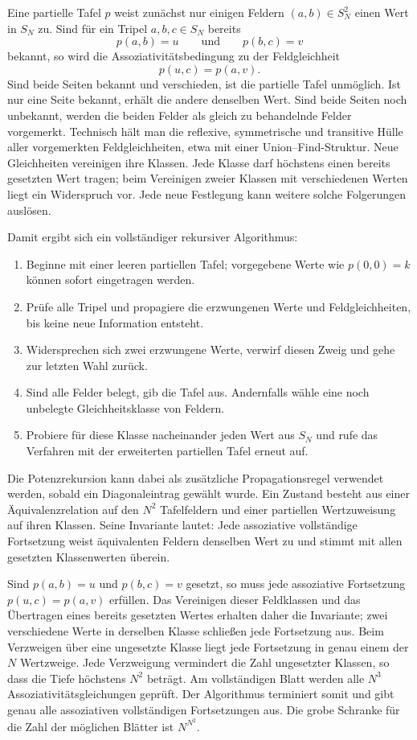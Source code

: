 \documentclass[main.tex]{subfiles}
\begin{document}
Eine partielle Tafel \(p\) weist zunächst nur einigen Feldern
\((a,b)\in S_N^2\) einen Wert in \(S_N\) zu.  Sind für ein Tripel
\(a,b,c\in S_N\) bereits
\[
  p(a,b)=u
  \qquad\text{und}\qquad
  p(b,c)=v
\]
bekannt, so wird die Assoziativitätsbedingung zu der Feldgleichheit
\[
  \boxed{p(u,c)=p(a,v).}
\]
Sind beide Seiten bekannt und verschieden, ist die partielle Tafel
unmöglich.  Ist nur eine Seite bekannt, erhält die andere denselben Wert.
Sind beide Seiten noch unbekannt, werden die beiden Felder als gleich zu
behandelnde Felder vorgemerkt.  Technisch hält man die reflexive, symmetrische
und transitive Hülle aller vorgemerkten Feldgleichheiten, etwa mit einer
Union--Find-Struktur.  Neue Gleichheiten vereinigen ihre Klassen.  Jede Klasse
darf höchstens einen bereits gesetzten Wert tragen; beim Vereinigen zweier
Klassen mit verschiedenen Werten liegt ein Widerspruch vor.  Jede neue
Festlegung kann weitere solche Folgerungen auslösen.

Damit ergibt sich ein vollständiger rekursiver Algorithmus:
\begin{enumerate}
  \item Beginne mit einer leeren partiellen Tafel; vorgegebene Werte wie
    \(p(0,0)=k\) können sofort eingetragen werden.
  \item Prüfe alle Tripel und propagiere die erzwungenen Werte und
    Feldgleichheiten, bis keine neue Information entsteht.
  \item Widersprechen sich zwei erzwungene Werte, verwirf diesen Zweig und
    gehe zur letzten Wahl zurück.
  \item Sind alle Felder belegt, gib die Tafel aus.  Andernfalls wähle eine
    noch unbelegte Gleichheitsklasse von Feldern.
  \item Probiere für diese Klasse nacheinander jeden Wert aus \(S_N\) und
    rufe das Verfahren mit der erweiterten partiellen Tafel erneut auf.
\end{enumerate}
Die Potenzrekursion kann dabei als zusätzliche Propagationsregel verwendet
werden, sobald ein Diagonaleintrag gewählt wurde.  Ein Zustand besteht aus
einer Äquivalenzrelation auf den \(N^2\) Tafelfeldern und einer partiellen
Wertzuweisung auf ihren Klassen.  Seine Invariante lautet: Jede assoziative
vollständige Fortsetzung weist äquivalenten Feldern denselben Wert zu und
stimmt mit allen gesetzten Klassenwerten überein.

Sind \(p(a,b)=u\) und \(p(b,c)=v\) gesetzt, so muss jede assoziative
Fortsetzung \(p(u,c)=p(a,v)\) erfüllen.  Das Vereinigen dieser Feldklassen und
das Übertragen eines bereits gesetzten Wertes erhalten daher die Invariante;
zwei verschiedene Werte in derselben Klasse schließen jede Fortsetzung aus.
Beim Verzweigen über eine ungesetzte Klasse liegt jede Fortsetzung in genau
einem der \(N\) Wertzweige.  Jede Verzweigung vermindert die Zahl ungesetzter
Klassen, so dass die Tiefe höchstens \(N^2\) beträgt.  Am vollständigen Blatt
werden alle \(N^3\) Assoziativitätsgleichungen geprüft.  Der Algorithmus
terminiert somit und gibt genau alle assoziativen vollständigen Fortsetzungen
aus.  Die grobe Schranke für die Zahl der möglichen Blätter ist
\(N^{N^2}\).
\end{document}
